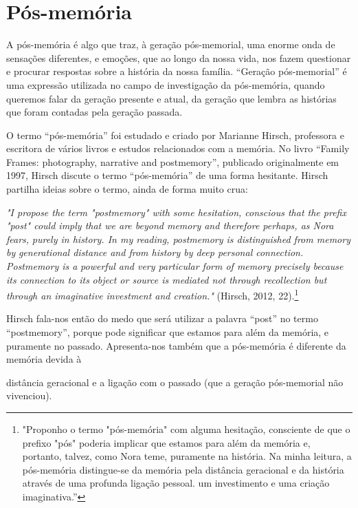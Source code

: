 \documentclass{article}
\begin{document}
\section{Pós-memória }
A pós-memória é algo que traz, à geração pós-memorial, uma enorme onda de 
sensações  diferentes,  e  emoções,  que  ao  longo  da  nossa  vida,  nos  fazem  questionar  e 
procurar  respostas  sobre  a  história  da  nossa  família.  “Geração  pós-memorial”  é  uma 
expressão utilizada no campo de investigação da pós-memória, quando queremos falar da 
geração  presente  e  atual,  da  geração  que  lembra  as  histórias  que  foram  contadas  pela 
geração passada. 
 
O termo “pós-memória” foi estudado e criado por Marianne Hirsch, professora e 
escritora  de  vários  livros  e  estudos  relacionados  com  a  memória.  No  livro  “Family 
Frames:  photography,  narrative  and  postmemory”,  publicado  originalmente  em  1997, 
Hirsch  discute  o  termo  “pós-memória”  de  uma  forma  hesitante.  Hirsch  partilha  ideias 
sobre o termo, ainda de forma muito crua:  

\textit{"I propose the term "postmemory" with some hesitation, conscious that the prefix }
\textit{"post" could imply that we are beyond memory and therefore perhaps, as Nora fears, }
\textit{purely  in  history.  In  my  reading,  postmemory  is  distinguished  from  memory  by }
\textit{generational distance and from history by deep personal connection. Postmemory is a }
\textit{powerful  and  very  particular  form  of  memory  precisely  because  its  connection  to  its }
\textit{object  or  source  is  mediated  not  through  recollection  but  through  an  imaginative }
\textit{investment and creation." }(Hirsch, 2012, 22).\footnote{"Proponho o termo "pós-memória" com alguma hesitação, consciente de que o prefixo "pós" poderia implicar que estamos para além da memória e, portanto, talvez, como Nora teme, puramente na história. Na minha leitura, a pós-memória distingue-se da memória pela distância geracional e da história através de uma profunda ligação pessoal. um investimento e uma criação imaginativa.” }  
 
Hirsch  fala-nos  então  do  medo  que  será  utilizar  a  palavra  “post”  no  termo 
“postmemory”, porque pode significar que estamos para além da memória, e puramente 
no passado. Apresenta-nos também que a pós-memória é diferente da memória devida à 
 

 



distância  geracional  e  a  ligação  com  o  passado  (que  a  geração  pós-memorial  não 
vivenciou). 
 
\end{document}
